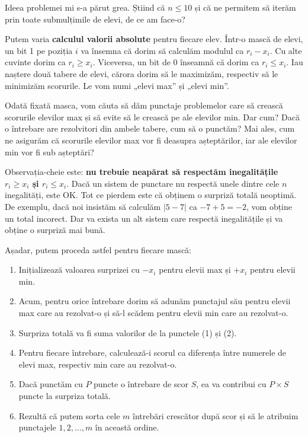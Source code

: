 Ideea problemei mi s-a părut grea. Știind că $n \leq 10$ și că ne permitem să iterăm prin toate submulțimile de elevi, de ce am face-o?

Putem varia \textbf{calculul valorii absolute} pentru fiecare elev. Într-o mască de elevi, un bit 1 pe poziția $i$ va însemna că dorim să calculăm modulul ca $r_i - x_i$. Cu alte cuvinte dorim ca $r_i \geq x_i$. Viceversa, un bit de 0 înseamnă că dorim ca $r_i \leq x_i$. Iau naștere două tabere de elevi, cărora dorim să le maximizăm, respectiv să le minimizăm scorurile. Le vom numi „elevi max” și „elevi min”.

Odată fixată masca, vom căuta să dăm punctaje problemelor care să crească scorurile elevilor max și să evite să le crească pe ale elevilor min. Dar cum? Dacă o întrebare are rezolvitori din ambele tabere, cum să o punctăm? Mai ales, cum ne asigurăm că scorurile elevilor max vor fi deasupra așteptărilor, iar ale elevilor min vor fi sub așteptări?

Observația-cheie este: \textbf{nu trebuie neapărat să respectăm inegalitățile $r_i \geq x_i$ și $r_i \leq x_i$}. Dacă un sistem de punctare nu respectă unele dintre cele $n$ inegalități, este OK. Tot ce pierdem este că obținem o surpriză totală neoptimă. De exemplu, dacă noi insistăm să calculăm $|5 - 7|$ ca $-7 + 5 = -2$, vom obține un total incorect. Dar va exista un alt sistem care respectă inegalitățile și va obține o surpriză mai bună.

Așadar, putem proceda astfel pentru fiecare mască:

\begin{enumerate}
  \item Inițializează valoarea surprizei cu $-x_i$ pentru elevii max și $+x_i$ pentru elevii min.

  \item Acum, pentru orice întrebare dorim să adunăm punctajul său pentru elevii max care au rezolvat-o și să-l scădem pentru elevii min care au rezolvat-o.

  \item Surpriza totală va fi suma valorilor de la punctele (1) și (2).

  \item Pentru fiecare întrebare, calculează-i scorul ca diferența între numerele de elevi max, respectiv min care au rezolvat-o.

  \item Dacă punctăm cu $P$ puncte o întrebare de scor $S$, ea va contribui cu $P \times S$ puncte la surpriza totală.

  \item Rezultă că putem sorta cele $m$ întrebări crescător după scor și să le atribuim punctajele $1, 2, \dots, m$ în această ordine.
\end{enumerate}


